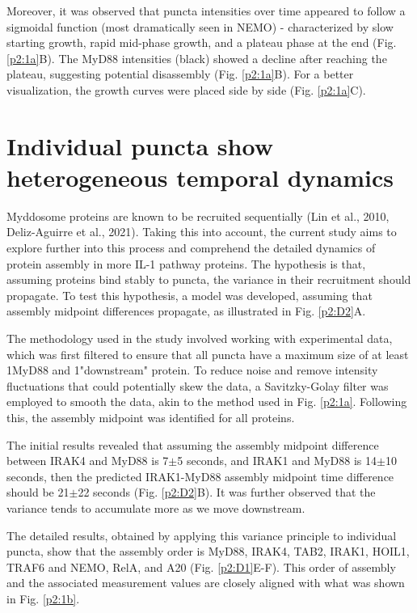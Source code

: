 Moreover, it was observed that puncta intensities over time appeared to follow a sigmoidal function (most dramatically seen in NEMO) - characterized by slow starting growth, rapid mid-phase growth, and a plateau phase at the end (Fig. \ref{p2:1a}B). The MyD88 intensities (black) showed a decline after reaching the plateau, suggesting potential disassembly (Fig. \ref{p2:1a}B). For a better visualization, the growth curves were placed side by side (Fig. \ref{p2:1a}C).

\section{Individual puncta show heterogeneous temporal dynamics}
Myddosome proteins are known to be recruited sequentially (Lin et al., 2010, Deliz-Aguirre et al., 2021). Taking this into account, the current study aims to explore further into this process and comprehend the detailed dynamics of protein assembly in more IL-1 pathway proteins. The hypothesis is that, assuming proteins bind stably to puncta, the variance in their recruitment should propagate. To test this hypothesis, a model was developed, assuming that assembly midpoint differences propagate, as illustrated in Fig. \ref{p2:D2}A.

The methodology used in the study involved working with experimental data, which was first filtered to ensure that all puncta have a maximum size of at least 1\times MyD88 and 1\times "downstream" protein. To reduce noise and remove intensity fluctuations that could potentially skew the data, a Savitzky-Golay filter was employed to smooth the data, akin to the method used in Fig. \ref{p2:1a}. Following this, the assembly midpoint was identified for all proteins.

The initial results revealed that assuming the assembly midpoint difference between IRAK4 and MyD88 is 7$\pm$5 seconds, and IRAK1 and MyD88 is 14$\pm$10 seconds, then the predicted IRAK1-MyD88 assembly midpoint time difference should be 21$\pm$22 seconds (Fig. \ref{p2:D2}B). It was further observed that the variance tends to accumulate more as we move downstream.

The detailed results, obtained by applying this variance principle to individual puncta, show that the assembly order is MyD88, IRAK4, TAB2, IRAK1, HOIL1, TRAF6 and NEMO, RelA, and A20 (Fig. \ref{p2:D1}E-F). This order of assembly and the associated measurement values are closely aligned with what was shown in Fig. \ref{p2:1b}.

